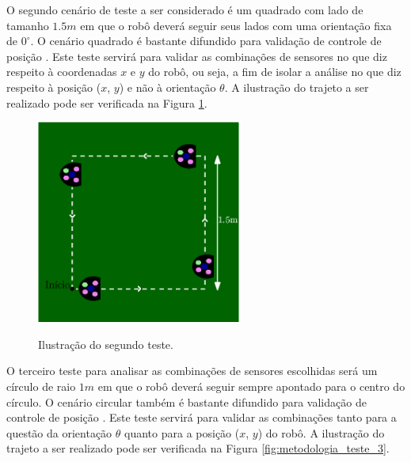 \documentclass[acronym, symbols]{fei}
\begin{document}
		O segundo cenário de teste a ser considerado é um quadrado com lado de tamanho $1.5m$ em que o robô deverá seguir seus lados com uma orientação fixa de $0^\circ$. O cenário quadrado é bastante difundido para validação de controle de posição \cites{rostami2018localization}{gonccalves2008real}{santini1997trajectory}. Este teste servirá para validar as combinações de sensores no que diz respeito à coordenadas $x$ e $y$ do robô, ou seja, a fim de isolar a análise no que diz respeito à posição ($x$, $y$) e não à orientação $\theta$. A ilustração do trajeto a ser realizado pode ser verificada na Figura \ref{fig:metodologia_teste_2}.
		
		\begin{figure}[!htb]
			\centering
			\caption{Ilustração do segundo teste.}
			\includegraphics[width=0.6\textwidth]{teste_2.eps}
			\label{fig:metodologia_teste_2}
		\end{figure}
		
		O terceiro teste para analisar as combinações de sensores escolhidas será um círculo de raio $1m$ em que o robô deverá seguir sempre apontado para o centro do círculo. O cenário circular também é bastante difundido para validação de controle de posição \cites{suliman2009mobile}{marton2013two}{rigatos2010extended}{eman2020mobile}. Este teste servirá para validar as combinações tanto para a questão da orientação $\theta$ quanto para a posição ($x$, $y$) do robô. A ilustração do trajeto a ser realizado pode ser verificada na Figura \ref{fig:metodologia_teste_3}.
		
\end{document}
